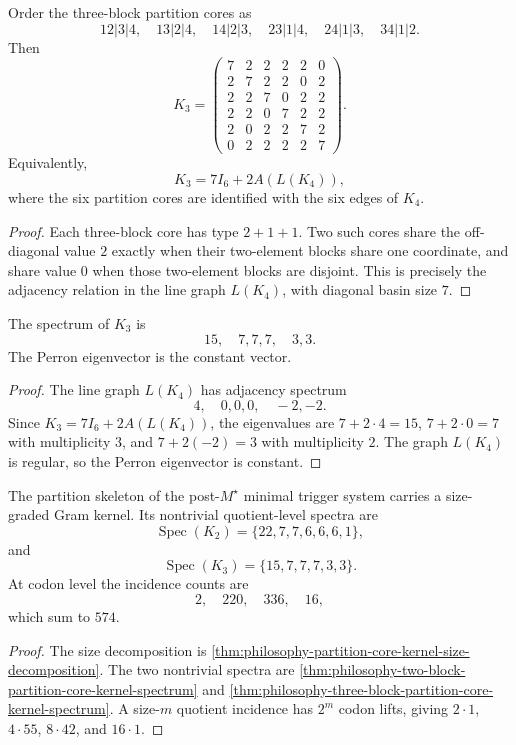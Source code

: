 \begin{theorem}
\label{thm:philosophy-three-block-partition-core-kernel}
Order the three-block partition cores as
$$
  12|3|4,\quad 13|2|4,\quad 14|2|3,
  \quad 23|1|4,\quad 24|1|3,\quad 34|1|2.
$$
Then
$$
K_{3}
=
\begin{pmatrix}
7&2&2&2&2&0\\
2&7&2&2&0&2\\
2&2&7&0&2&2\\
2&2&0&7&2&2\\
2&0&2&2&7&2\\
0&2&2&2&2&7
\end{pmatrix}.
$$
Equivalently,
$$
  K_{3}=7I_{6}+2A(L(K_{4})),
$$
where the six partition cores are identified with the six edges of
$K_{4}$.
\end{theorem}
\begin{proof}
Each three-block core has type $2+1+1$. Two such cores share the
off-diagonal value $2$ exactly when their two-element blocks share one
coordinate, and share value $0$ when those two-element blocks are
disjoint. This is precisely the adjacency relation in the line graph
$L(K_{4})$, with diagonal basin size $7$.
\end{proof}

\begin{theorem}
\label{thm:philosophy-three-block-partition-core-kernel-spectrum}
The spectrum of $K_{3}$ is
$$
  15,\quad 7,7,7,\quad 3,3.
$$
The Perron eigenvector is the constant vector.
\end{theorem}
\begin{proof}
The line graph $L(K_{4})$ has adjacency spectrum
$$
  4,\quad 0,0,0,\quad -2,-2.
$$
Since $K_{3}=7I_{6}+2A(L(K_{4}))$, the eigenvalues are
$7+2\cdot4=15$, $7+2\cdot0=7$ with multiplicity $3$, and
$7+2(-2)=3$ with multiplicity $2$. The graph $L(K_{4})$ is regular, so
the Perron eigenvector is constant.
\end{proof}

\begin{theorem}
\label{thm:philosophy-partition-core-incidence-kernel-theorem}
The partition skeleton of the post-$M^{\star}$ minimal trigger system
carries a size-graded Gram kernel. Its nontrivial quotient-level spectra
are
$$
  \operatorname{Spec}(K_{2})
  =
  \{22,7,7,6,6,6,1\},
$$
and
$$
  \operatorname{Spec}(K_{3})
  =
  \{15,7,7,7,3,3\}.
$$
At codon level the incidence counts are
$$
  2,\quad 220,\quad 336,\quad 16,
$$
which sum to $574$.
\end{theorem}
\begin{proof}
The size decomposition is
\autoref{thm:philosophy-partition-core-kernel-size-decomposition}. The
two nontrivial spectra are
\autoref{thm:philosophy-two-block-partition-core-kernel-spectrum} and
\autoref{thm:philosophy-three-block-partition-core-kernel-spectrum}. A
size-$m$ quotient incidence has $2^{m}$ codon lifts, giving
$2\cdot1$, $4\cdot55$, $8\cdot42$, and $16\cdot1$.
\end{proof}

